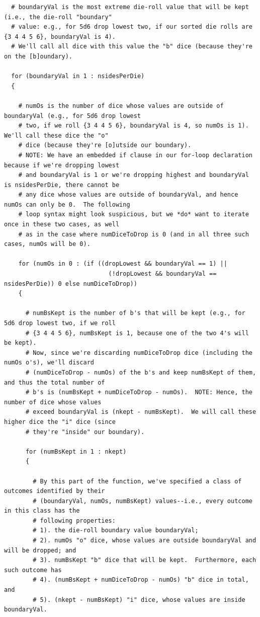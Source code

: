 \documentclass[12pt]{article}
\begin{document}
\begin{lstlisting}
  # boundaryVal is the most extreme die-roll value that will be kept (i.e., the die-roll "boundary"
  # value: e.g., for 5d6 drop lowest two, if our sorted die rolls are {3 4 4 5 6}, boundaryVal is 4).
  # We'll call all dice with this value the "b" dice (because they're on the [b]oundary).
  
  for (boundaryVal in 1 : nsidesPerDie)
  {
    
    # numOs is the number of dice whose values are outside of boundaryVal (e.g., for 5d6 drop lowest 
    # two, if we roll {3 4 4 5 6}, boundaryVal is 4, so numOs is 1).  We'll call these dice the "o"
    # dice (because they're [o]utside our boundary).  
    # NOTE: We have an embedded if clause in our for-loop declaration because if we're dropping lowest 
    # and boundaryVal is 1 or we're dropping highest and boundaryVal is nsidesPerDie, there cannot be 
    # any dice whose values are outside of boundaryVal, and hence numOs can only be 0.  The following 
    # loop syntax might look suspicious, but we *do* want to iterate once in these two cases, as well
    # as in the case where numDiceToDrop is 0 (and in all three such cases, numOs will be 0).
    
    for (numOs in 0 : (if ((dropLowest && boundaryVal == 1) ||
                             (!dropLowest && boundaryVal == nsidesPerDie)) 0 else numDiceToDrop))
    {
      
      # numBsKept is the number of b's that will be kept (e.g., for 5d6 drop lowest two, if we roll
      # {3 4 4 5 6}, numBsKept is 1, because one of the two 4's will be kept).
      # Now, since we're discarding numDiceToDrop dice (including the numOs o's), we'll discard 
      # (numDiceToDrop - numOs) of the b's and keep numBsKept of them, and thus the total number of
      # b's is (numBsKept + numDiceToDrop - numOs).  NOTE: Hence, the number of dice whose values
      # exceed boundaryVal is (nkept - numBsKept).  We will call these higher dice the "i" dice (since
      # they're "inside" our boundary).
      
      for (numBsKept in 1 : nkept)
      {
        
        # By this part of the function, we've specified a class of outcomes identified by their 
        # (boundaryVal, numOs, numBsKept) values--i.e., every outcome in this class has the
        # following properties:
        # 1). the die-roll boundary value boundaryVal; 
        # 2). numOs "o" dice, whose values are outside boundaryVal and will be dropped; and
        # 3). numBsKept "b" dice that will be kept.  Furthermore, each such outcome has
        # 4). (numBsKept + numDiceToDrop - numOs) "b" dice in total, and 
        # 5). (nkept - numBsKept) "i" dice, whose values are inside boundaryVal.
        

\end{lstlisting}
\end{document}
